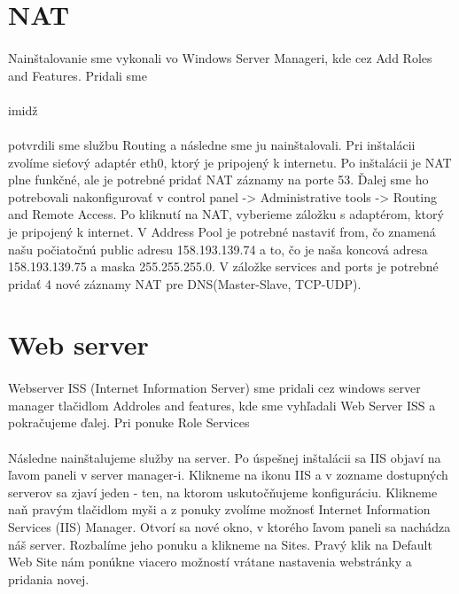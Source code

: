 \section{NAT}
\paragraph{}
Nainštalovanie sme vykonali vo Windows Server Manageri, kde cez Add Roles and Features. Pridali sme
\\
\\
imidž
\paragraph{}
potvrdili sme službu Routing a následne sme ju nainštalovali. Pri inštalácii zvolíme sie\v{t}ový adaptér eth0, ktorý je pripojený k internetu. Po inštalácii je NAT plne funkčné, ale je potrebné prida\v{t} NAT záznamy na porte 53.  Ďalej sme ho potrebovali nakonfigurovať v control panel -\textgreater{} Administrative tools -\textgreater{} Routing and Remote Access. Po kliknutí na NAT, vyberieme záložku s adaptérom, ktorý je pripojený k internet. V Address Pool je potrebné nastavi\v{t} from, čo znamená našu počiatočnú public adresu 158.193.139.74 a to, čo je naša koncová adresa 158.193.139.75 a maska 255.255.255.0. V záložke services and ports je potrebné prida\v{t} 4 nové záznamy NAT pre DNS(Master-Slave, TCP-UDP).

\section{Web server}
\paragraph{}
Webserver ISS (Internet Information Server) sme pridali cez windows server manager tlačidlom Addroles and features, kde sme vyhľadali Web Server ISS a pokračujeme ďalej. Pri ponuke Role Services
\paragraph{}
Následne nainštalujeme služby na server. Po úspešnej inštalácii sa IIS objaví na \v{l}avom paneli v server manager-i. Klikneme na ikonu IIS a v zozname dostupných serverov sa zjaví jeden - ten, na ktorom uskuto\v{c}\v{n}ujeme konfiguráciu. Klikneme na\v{n} pravým tla\v{c}idlom myši a z ponuky zvolíme možnos\v{t} Internet Information Services (IIS) Manager. Otvorí sa nové okno, v ktorého \v{l}avom paneli sa nachádza náš server. Rozbalíme jeho ponuku a klikneme na Sites. Pravý klik na Default Web Site nám ponúkne viacero možností vrátane nastavenia webstránky a pridania novej.

